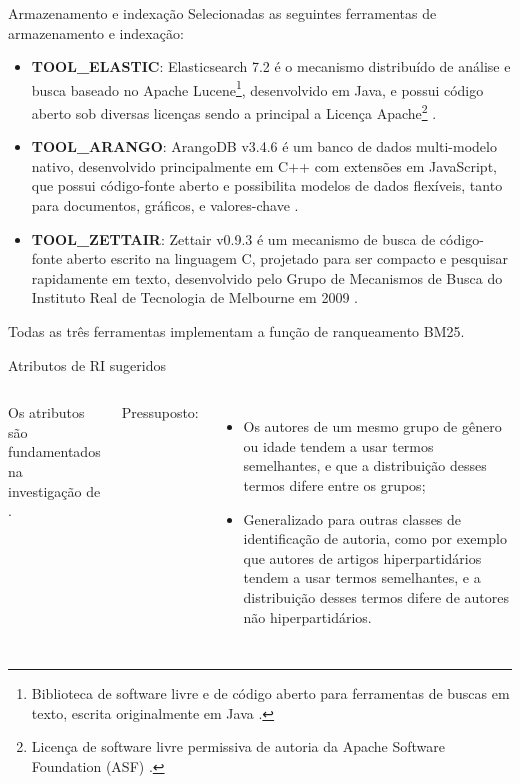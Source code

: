 \documentclass[%
  10pt,%
  aspectratio = 169,%
  compress,%
  t,%
]{beamer}%
\begin{document}
    \begin{frame}{}{Armazenamento e indexação}
        Selecionadas as seguintes ferramentas de armazenamento e indexação:
        \begin{itemize}
            \item \textbf{TOOL\_ELASTIC}: Elasticsearch 7.2 é o mecanismo distribuído de análise e busca baseado no Apache Lucene\footnote{Biblioteca de software livre e de código aberto para ferramentas de buscas em texto, escrita originalmente em Java \cite{LUCENE_DOCUMENTATION_2019}.}, desenvolvido em Java, e possui código aberto sob diversas licenças sendo a principal a Licença Apache\footnote{Licença de software livre permissiva de autoria da Apache Software Foundation (ASF) \cite{NEWMEDIA_OPENGUIDE_2015}.} \cite{ELASTIC_GitHub_2019, ELASTIC_REFERENCE_INTRO_2019}.
            
            \item \textbf{TOOL\_ARANGO}: ArangoDB v3.4.6 é um banco de dados multi-modelo nativo, desenvolvido principalmente em C++ com extensões em JavaScript, que possui código-fonte aberto e possibilita modelos de dados flexíveis, tanto para documentos, gráficos, e valores-chave \cite{ARANGODB_DOC_2019, ARANGODB_GitHub_2019}.
            
            \item \textbf{TOOL\_ZETTAIR}: Zettair v0.9.3 é um mecanismo de busca de código-fonte aberto escrito na linguagem C, projetado para ser compacto e pesquisar rapidamente em texto, desenvolvido pelo Grupo de Mecanismos de Busca do Instituto Real de Tecnologia de Melbourne em 2009 \cite{ZETTAIR_HOME_2009}. 
        \end{itemize}
        
        Todas as três ferramentas implementam a função de ranqueamento BM25.
    \end{frame}
    
    \begin{frame}{}{Atributos de RI sugeridos}
        \begin{columns}[t]
            Os atributos são fundamentados na investigação de \cite{WEREN_MESTRADO_2014}. 
            
            Pressuposto:
            \begin{itemize}
                \item Os autores de um mesmo grupo de gênero ou idade tendem a usar termos semelhantes, e que a distribuição desses termos difere entre os grupos;
                \item Generalizado para outras classes de identificação de autoria, como por exemplo que autores de artigos hiperpartidários tendem a usar termos semelhantes, e a distribuição desses termos difere de autores não hiperpartidários.
            \end{itemize}
            
            
        \end{columns}
    \end{frame}
    
\end{document}
